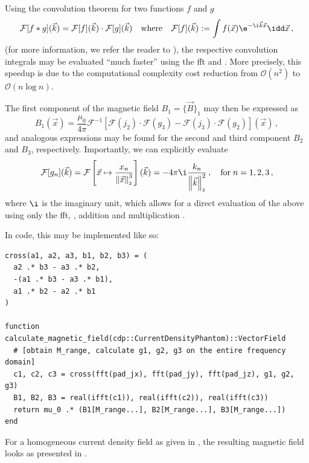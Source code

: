 \documentclass[12pt]{article}
\renewcommand{\norm}[1]{\left\lVert#1\right\rVert_{\scriptscriptstyle 2}}
\begin{document}
  Using the convolution theorem for two functions $f$ and $g$
  $$\mathcal{F}[f * g](\vec{k}) = \mathcal{F}[f](\vec{k}) \cdot \mathcal{F}[g](\vec{k}) \quad\text{where}\quad \mathcal{F}[f](\vec{k}) := \int f(\vec{x}) \e^{-\i \vec{k} \vec{x}}\idd\vec{x}\,,$$
  (for more information, we refer the reader to \cite{2022-convolution-theorem}), the respective convolution integrals may be evaluated ``much faster'' using the \gls{fft} and .
  More precisely, this speedup is due to the computational complexity cost reduction from $\mathcal{O}(n^2)$ to $\mathcal{O}(n \log n)$. %

  The first component of the magnetic field $B_1 = \{\vec{B}\}_1$ may then be expressed as
  $$B_1(\vec{x}) = \frac{\mu_0}{4\pi}\mathcal{F}^{-1}\left[\mathcal{F}(j_2) \cdot \mathcal{F}(g_3) - \mathcal{F}(j_3) \cdot \mathcal{F}(g_2)\right](\vec{x})\,,$$
  and analogous expressions may be found for the second and third component $B_2$ and $B_3$, respectively.
  Importantly, we can explicitly evaluate
  $$\mathcal{F}[g_n](\vec{k}) = \mathcal{F}\left[\vec{x} \mapsto \frac{x_n}{\norm{\vec{x}}^3}\right](\vec{k}) = -4\pi\i \frac{k_n}{\norm{\vec{k}}^2}\,, \quad\text{for}\; n=1,2,3\,,$$
  where $\i$ is the imaginary unit,
  which allows for a direct evaluation of the above using only the \gls{fft}, , addition and multiplication \parencite{2020-biot-savart-evaluation-fft}.

  In code, this may be implemented like so:
  \begin{verbatim}
cross(a1, a2, a3, b1, b2, b3) = (
  a2 .* b3 - a3 .* b2,
  -(a1 .* b3 - a3 .* b1),
  a1 .* b2 - a2 .* b1
)

function calculate_magnetic_field(cdp::CurrentDensityPhantom)::VectorField
  # [obtain M_range, calculate g1, g2, g3 on the entire frequency domain]
  c1, c2, c3 = cross(fft(pad_jx), fft(pad_jy), fft(pad_jz), g1, g2, g3)
  B1, B2, B3 = real(ifft(c1)), real(ifft(c2)), real(ifft(c3))
  return mu_0 .* (B1[M_range...], B2[M_range...], B3[M_range...])
end
  \end{verbatim}

  For a homogeneous current density field as given in , the resulting magnetic field looks as presented in .
\end{document}
